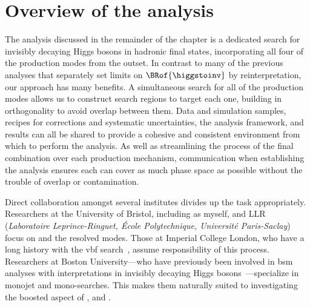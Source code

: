 

\section{Overview of the analysis}
\label{sec:htoinv_analysis_overview}

The analysis discussed in the remainder of the chapter is a dedicated search for invisibly decaying Higgs bosons in hadronic final states, incorporating all four of the production modes from the outset. In contrast to many of the previous analyses that separately set limits on $\BRof{\higgstoinv}$ by reinterpretation, our approach has many benefits. A simultaneous search for all of the production modes allows us to construct search regions to target each one, building in orthogonality to avoid overlap between them. Data and simulation samples, recipes for corrections and systematic uncertainties, the analysis framework, and results can all be shared to provide a cohesive and consistent environment from which to perform the analysis. As well as streamlining the process of the final combination over each production mechanism, communication when establishing the analysis ensures each can cover as much phase space as possible without the trouble of overlap or contamination.

Direct collaboration amongst several institutes divides up the task appropriately. Researchers at the University of Bristol, including as myself, and LLR (\emph{Laboratoire Leprince-Ringuet, \'{E}cole Polytechnique, Universit\'{e} Paris-Saclay}) focus on \ttH and the resolved \VH modes. Those at Imperial College London, who have a long history with the \acrshort{vbf} search~\cite{Chatrchyan:2014tja,Sirunyan:2018owy}, assume responsibility of this process. Researchers at Boston University---who have previously been involved in \acrshort{bsm} analyses with interpretations in invisibly decaying Higgs bosons~\cite{Khachatryan:2016mdm,Sirunyan:2017jix}---specialize in monojet and mono-\PVec searches. This makes them naturally suited to investigating the boosted aspect of \VH, and \ggF.

